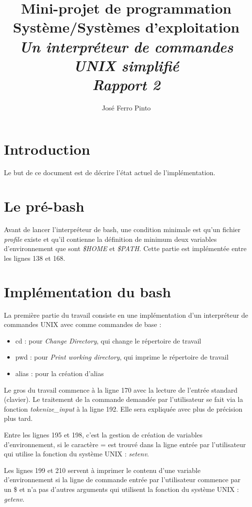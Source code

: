 \documentclass[a4paper,10pt]{article}
\title{Mini-projet de programmation Système/Systèmes d’exploitation\\
\large\emph{Un interpréteur de commandes UNIX simplifié}\\
\emph{Rapport 2}}
\author{José Ferro Pinto}
\begin{document}
\maketitle

\section{Introduction}
Le but de ce document est de décrire l'état actuel de l'implémentation.

\section{Le pré-bash}
Avant de lancer l'interpréteur de bash, une condition minimale est qu'un fichier \emph{profile} existe et qu'il contienne la définition de minimum deux variables d'environnement que sont \emph{\$HOME} et \emph{\$PATH}.
Cette partie est implémentée entre les lignes 138 et 168.

\section{Implémentation du bash}

La première partie du travail consiste en une implémentation d'un interpréteur de commandes UNIX avec comme commandes de base :
\begin{itemize}
	\item cd : pour \emph{Change Directory}, qui change le répertoire de travail
	\item pwd : pour \emph{Print working directory}, qui imprime le répertoire de travail
	\item alias : pour la création d'alias
\end{itemize}

Le gros du travail commence à la ligne 170 avec la lecture de l'entrée standard (clavier). Le traitement de la commande demandée par l'utilisateur se fait via la fonction \emph{tokenize\_input} à la ligne 192. Elle sera expliquée avec plus de précision plus tard.

Entre les lignes 195 et 198, c'est la gestion de création de variables d'environnement, si le caractère = est trouvé dans la ligne entrée par l'utilisateur qui utilise la fonction du système UNIX : \emph{setenv}.

Les lignes 199 et 210 servent à imprimer le contenu d'une variable d'environnement si la ligne de commande entrée par l'utilisateur commence par un \$ et n'a pas d'autres arguments qui utilisent la fonction du système UNIX : \emph{getenv}.
\end{document}
